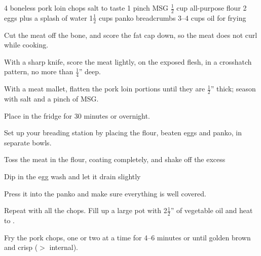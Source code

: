 \dishtype{\main}
\dishother{}
\begin{ingreds}
    4 boneless pork loin chops
    salt to taste
    1 pinch MSG
    $\frac{1}{2}$ cup all-purpose flour
    2 eggs plus a splash of water
    1$\frac{1}{2}$ cups panko breadcrumbs
    3--4 cups oil for frying
\end{ingreds}
\begin{method}
    Cut the meat off the bone, and score the fat cap down, so the meat does not curl while cooking.\par
    With a sharp knife, score the meat lightly, on the exposed flesh, in a crosshatch pattern, no more than $\frac{1}{4}$'' deep.\par
	With a meat mallet, flatten the pork loin portions until they are $\frac{1}{2}$'' thick; season with salt and a pinch of MSG.\@\par
    Place in the fridge for 30 minutes or overnight.\par
	Set up your breading station by placing the flour, beaten eggs and panko, in separate bowls.\par
    Toss the meat in the flour, coating completely, and shake off the excess\par
    Dip in the egg wash and let it drain slightly\par
    Press it into the panko and make sure everything is well covered.\par
    Repeat with all the chops.
	Fill up a large pot with 2$\frac{1}{2}$'' of vegetable oil and heat to .\par
    Fry the pork chops, one or two at a time for 4--6 minutes or until golden brown and crisp ($>$ internal).
\end{method}